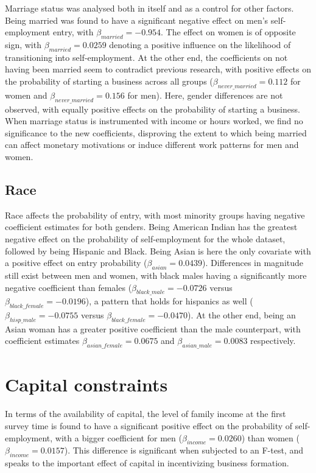 Marriage status was analysed both in itself and as a control for other factors. Being married was found to have a significant negative effect on men’s self-employment entry, with $\beta_{married} = -0.954$. The effect on women is of opposite sign, with $\beta_{married} = 0.0259$ denoting a positive influence on the likelihood of transitioning into self-employment. At the other end, the coefficients on not having been married seem to contradict previous research, with positive effects on the probability of starting a business across all groups ($\beta_{never\_married} = 0.112$ for women and $\beta_{never\_married} = 0.156$ for men). Here, gender differences are not observed, with equally positive effects on the probability of starting a business. When marriage status is instrumented with income or  hours worked, we find no significance to the new coefficients, disproving the extent to which being married can affect monetary motivations or induce different work patterns for men and women. 

\subsection{Race}

Race affects the probability of entry, with most minority groups having negative coefficient estimates for both genders. Being American Indian has the greatest negative effect on the probability of self-employment for the whole dataset, followed by being Hispanic and Black. Being Asian is here the only covariate with a positive effect on entry probability ($\beta_{asian} = 0.0439$). Differences in magnitude still exist between men and women, with black males having a significantly more negative coefficient than females ($\beta_{black\_male} = -0.0726$ versus $\beta_{black\_female} = -0.0196$), a pattern that holds for hispanics as well ($\beta_{hisp\_male} = -0.0755$ versus $\beta_{black\_female} = -0.0470$). At the other end, being an Asian woman has a greater positive coefficient than the male counterpart, with coefficient estimates $\beta_{asian\_female} = 0.0675$ and $\beta_{asian\_male} = 0.0083$ respectively. 

\section{Capital constraints}

In terms of the availability of capital, the level of family income at the first survey time is found to have a significant positive effect on the probability of self-employment, with a bigger coefficient for men ($\beta_{income} = 0.0260$) than women ($\beta_{income} = 0.0157$). This difference is significant when subjected to an F-test, and speaks to the important effect of capital in incentivizing business formation.

